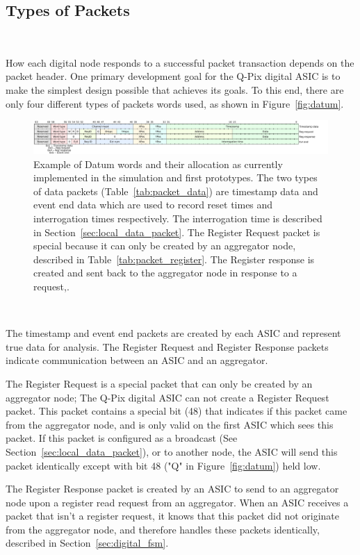 \subsection{Types of Packets}~\label{sec:digi_packets}

How each digital node responds to a successful packet transaction depends on the packet header.
One primary development goal for the Q-Pix digital ASIC is to make the simplest design possible that achieves its goals.
To this end, there are only four different types of packets words used, as shown in Figure~\ref{fig:datum}.

\begin{figure}[]
\centering
\includegraphics[width=\textwidth]{images/qpix_word_format.pdf}
\caption{Example of Datum words and their allocation as currently implemented in the simulation and first prototypes.
The two types of data packets (Table~\ref{tab:packet_data}) are timestamp data and event end data which are used to record reset times and interrogation times respectively.
The interrogation time is described in Section~\ref{sec:local_data_packet}.
The Register Request packet is special because it can only be created by an aggregator node, described in Table~\ref{tab:packet_register}. 
The Register response is created and sent back to the aggregator node in response to a request,.
}
\end{figure}~\label{fig:datum}

The timestamp and event end packets are created by each ASIC and represent true data for analysis.
The Register Request and Register Response packets indicate communication between an ASIC and an aggregator.

The Register Request is a special packet that can only be created by an aggregator node; The Q-Pix digital ASIC can not create a Register Request packet.
This packet contains a special bit (48) that indicates if this packet came from the aggregator node, and is only valid on the first ASIC which sees this packet.
If this packet is configured as a broadcast (See Section~\ref{sec:local_data_packet}), or to another node, the ASIC will send this packet identically except with bit 48 ("Q" in Figure~\ref{fig:datum}) held low.

The Register Response packet is created by an ASIC to send to an aggregator node upon a register read request from an aggregator.
When an ASIC receives a packet that isn't a register request, it knows that this packet did not originate from the aggregator node, and therefore handles these packets identically, described in Section~\ref{sec:digital_fsm}.

